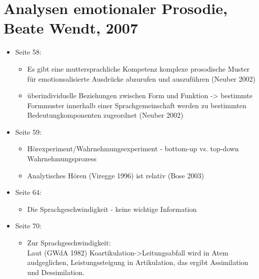 \documentclass[11pt,a4paper,headsepline,twoside,toc=bibliography]{scrreprt}
\begin{document}
\section{Analysen emotionaler Prosodie, Beate Wendt, 2007}
\begin{itemize}
	
		
	\item Seite 58:
	\begin{itemize}
		\item Es gibt eine muttersprachliche Kompetenz komplexe prosodische Muster für emotionsalisierte Ausdrücke abzurufen und auszuführen (Neuber 2002)
		\item überindividuelle Beziehungen zwischen Form und Funktion -> bestimmte Formmuster innerhalb einer Sprachgemeinschaft werden zu bestimmten Bedeutungkomponenten zugeordnet (Neuber 2002)	
	\end{itemize}

	\item Seite 59:
	\begin{itemize}	
		\item Hörexperiment/Wahrnehmungsexperiment - bottom-up vs. top-down Wahrnehmungsprozess 
		\item Analytisches Hören (Viregge 1996) ist relativ (Bose 2003)
	\end{itemize}

	\item Seite 64:
	\begin{itemize}
		\item Die Sprachgeschwindigkeit - keine wichtige Information
	\end{itemize}
	 
	
	\item Seite 70:
	\begin{itemize}
		\item Zur Sprachgeschwindigkeit:\\
		Laut (GWdA 1982) Koartikulation->Leitungsabfall wird in Atem audgeglichen, Leistungssteigung in Artikulation, das ergibt Assimilation und Dessimilation. 
	\end{itemize} 
\end{itemize}
\end{document}
